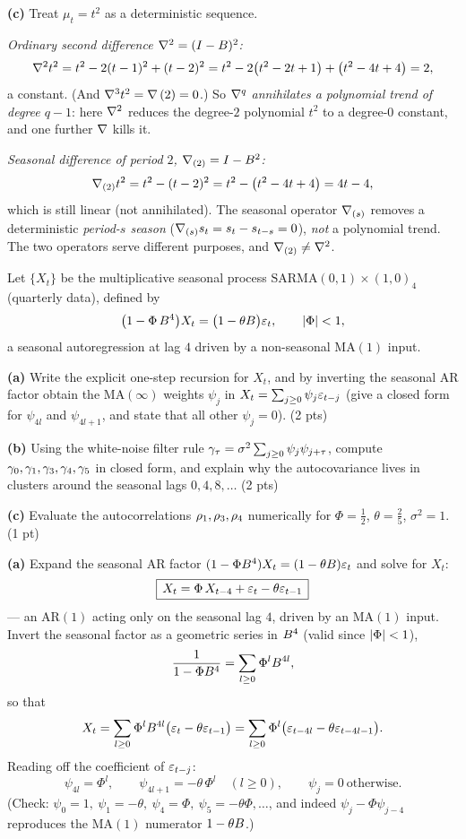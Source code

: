 \documentclass[11pt]{article}
\begin{document}
\textbf{(c)} Treat $\mu_t=t^{2}$ as a deterministic sequence.

\emph{Ordinary second difference $\nabla^{2}=(I-B)^{2}$:}
\[
\nabla^{2}t^{2}=t^{2}-2(t-1)^{2}+(t-2)^{2}
=t^{2}-2\bigl(t^{2}-2t+1\bigr)+\bigl(t^{2}-4t+4\bigr)
=2 ,
\]
a constant. (And $\nabla^{3}t^{2}=\nabla\,(2)=0$.) So $\nabla^{q}$ \emph{annihilates a polynomial trend of degree $q-1$}: here $\nabla^{2}$ reduces the degree-$2$ polynomial $t^{2}$ to a degree-$0$ constant, and one further $\nabla$ kills it.

\emph{Seasonal difference of period $2$, $\nabla_{(2)}=I-B^{2}$:}
\[
\nabla_{(2)}t^{2}=t^{2}-(t-2)^{2}=t^{2}-\bigl(t^{2}-4t+4\bigr)=4t-4 ,
\]
which is still linear (not annihilated). The seasonal operator $\nabla_{(s)}$ removes a deterministic \emph{period-$s$ season} ($\nabla_{(s)}s_t=s_t-s_{t-s}=0$), \emph{not} a polynomial trend. The two operators serve different purposes, and $\nabla_{(2)}\neq\nabla^{2}$.

\statementstart
Let $\{X_t\}$ be the multiplicative seasonal process $\mathrm{SARMA}(0,1)\times(1,0)_{4}$ (quarterly data), defined by
\[
\bigl(1-\Phi\,B^{4}\bigr)X_t=\bigl(1-\theta B\bigr)\varepsilon_t,
\qquad \left\lvert \Phi \right\rvert<1 ,
\]
a seasonal autoregression at lag $4$ driven by a non-seasonal $\mathrm{MA}(1)$ input.

\textbf{(a)} Write the explicit one-step recursion for $X_t$, and by inverting the seasonal AR factor obtain the $\mathrm{MA}(\infty)$ weights $\psi_j$ in $X_t=\sum_{j\ge0}\psi_j\varepsilon_{t-j}$ (give a closed form for $\psi_{4l}$ and $\psi_{4l+1}$, and state that all other $\psi_j=0$). \hfill(2 pts)

\textbf{(b)} Using the white-noise filter rule $\gamma_\tau=\sigma^{2}\sum_{j\ge0}\psi_j\psi_{j+\tau}$, compute $\gamma_0,\gamma_1,\gamma_3,\gamma_4,\gamma_5$ in closed form, and explain why the autocovariance lives in clusters around the seasonal lags $0,4,8,\dots$ \hfill(2 pts)

\textbf{(c)} Evaluate the autocorrelations $\rho_1,\rho_3,\rho_4$ numerically for $\Phi=\tfrac12$, $\theta=\tfrac25$, $\sigma^{2}=1$. \hfill(1 pt)
\statementend

\textbf{(a)} Expand the seasonal AR factor $(1-\Phi B^{4})X_t=(1-\theta B)\varepsilon_t$ and solve for $X_t$:
\[
\boxed{\,X_t=\Phi\,X_{t-4}+\varepsilon_t-\theta\varepsilon_{t-1}\,}
\]
--- an $\mathrm{AR}(1)$ acting only on the seasonal lag $4$, driven by an $\mathrm{MA}(1)$ input. Invert the seasonal factor as a geometric series in $B^{4}$ (valid since $\left\lvert \Phi \right\rvert<1$),
\[
\frac{1}{1-\Phi B^{4}}=\sum_{l\ge0}\Phi^{l}B^{4l},
\]
so that
\[
X_t=\sum_{l\ge0}\Phi^{l}B^{4l}\bigl(\varepsilon_t-\theta\varepsilon_{t-1}\bigr)
=\sum_{l\ge0}\Phi^{l}\bigl(\varepsilon_{t-4l}-\theta\varepsilon_{t-4l-1}\bigr).
\]
Reading off the coefficient of $\varepsilon_{t-j}$:
\[
\boxed{\;\psi_{4l}=\Phi^{l},\qquad \psi_{4l+1}=-\theta\,\Phi^{l}\quad(l\ge0),\qquad \psi_j=0\ \text{otherwise.}\;}
\]
(Check: $\psi_0=1,\ \psi_1=-\theta,\ \psi_4=\Phi,\ \psi_5=-\theta\Phi,\dots$, and indeed $\psi_j-\Phi\psi_{j-4}$ reproduces the $\mathrm{MA}(1)$ numerator $1-\theta B$.)
\end{document}
